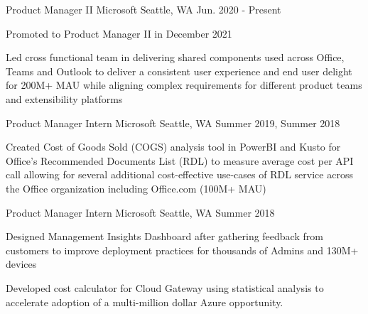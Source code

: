 

\begin{cventries}

  \cventry
    {Product Manager II} %
    {Microsoft} %
    {} %
    {Seattle, WA} %
    {Jun. 2020 - Present} %
    {
      \begin{cvitems} %
        \item Promoted to Product Manager II in December 2021
        \item {Led cross functional team in delivering shared components used across Office, Teams and Outlook to deliver a consistent user experience and end user delight for 200M+ MAU while aligning complex requirements for different product teams and extensibility platforms}
      \end{cvitems}
    }

  \cventry
    {Product Manager Intern} %
    {Microsoft} %
    {} %
    {Seattle, WA} %
    {Summer 2019, Summer 2018} %
    {
      \begin{cvitems} %
        \item {Created Cost of Goods Sold (COGS) analysis tool in PowerBI and Kusto for Office's Recommended Documents List (RDL) to measure average cost per API call allowing for several additional cost-effective use-cases of RDL service across the Office organization including Office.com (100M+ MAU)}
      \end{cvitems}
    }

  \cventry
    {Product Manager Intern} %
    {Microsoft} %
    {} %
    {Seattle, WA} %
    {Summer 2018} %
    {
      \begin{cvitems} %
        \item {Designed Management Insights Dashboard after gathering feedback from customers to improve deployment practices for thousands of Admins and 130M+ devices}
        \item {Developed cost calculator for Cloud Gateway using statistical analysis to accelerate adoption of a multi-million dollar Azure opportunity.}
      \end{cvitems}
    }


\end{cventries}
